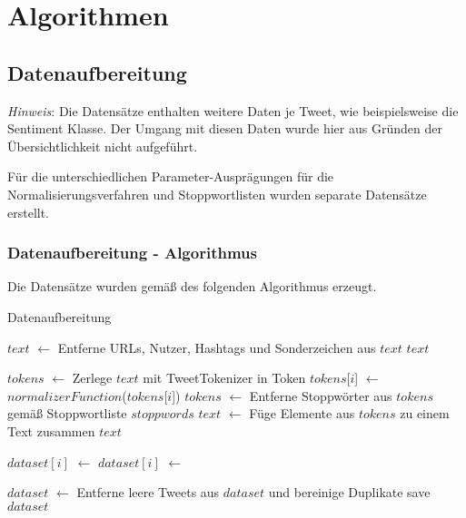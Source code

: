 \section{Algorithmen}

\subsection{Datenaufbereitung}\label{subsec:appendix-data-preparation}

\textit{Hinweis}: Die Datensätze enthalten weitere Daten je Tweet, wie beispielsweise die Sentiment Klasse.
Der Umgang mit diesen Daten wurde hier aus Gründen der Übersichtlichkeit nicht aufgeführt.

Für die unterschiedlichen Parameter-Ausprägungen für die Normalisierungsverfahren und Stoppwortlisten wurden separate Datensätze erstellt.

\subsubsection{Datenaufbereitung - Algorithmus}
Die Datensätze wurden gemäß des folgenden Algorithmus erzeugt.
\begin{algorithm}
    \caption{Datenaufbereitung}
    \begin{algorithmic}[1]
                \State $text$ $\gets$ Entferne URLs, Nutzer, Hashtags und Sonderzeichen aus $text$
                \State \Return $text$
            \EndFunction

                \State $tokens$ $\gets$ Zerlege $text$ mit TweetTokenizer in Token
                    \State $tokens$[$i$] $\gets$ $normalizerFunction$($tokens$[$i$])
                \EndFor
                \State $tokens$ $\gets$ Entferne Stoppwörter aus $tokens$ gemäß Stoppwortliste $stoppwords$
                \State $text$ $\gets$ Füge Elemente aus $tokens$ zu einem Text zusammen
                \State \Return $text$
            \EndFunction

                \State $dataset[i]$ $\gets$ 
                \State $dataset[i]$ $\gets$ 
            \EndFor

            \State $dataset$ $\gets$ Entferne leere Tweets aus $dataset$ und bereinige Duplikate
            \State save $dataset$
        \EndProcedure
    \end{algorithmic}
    \label{alg:data-preparation}
\end{algorithm}

